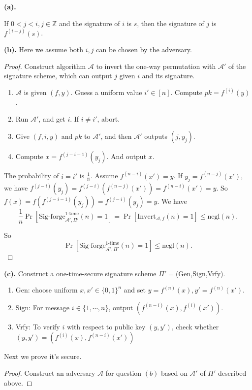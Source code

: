 \documentclass[a4paper]{article}
\newcommand{\negl}{\text{negl}}
\newcommand{\otime}{\text{1-time}}
\newcommand{\Invert}{\text{Invert}}
\newcommand{\Z}{\mathbb{Z}}
\newcommand{\A}{\mathcal{A}}
\newenvironment{problem}[2][Problem]{\begin{trivlist}
\item[\hskip \labelsep {\bfseries #1}\hskip \labelsep {\bfseries #2.}]}{\end{trivlist}}
\begin{document}
\begin{problem}{12.8}
\textbf{(a).}\par
If $0<j<i,j\in\Z$ and the signature of $i$ is $s$, then the signature of $j$ is $f^{(i-j)}(s)$.\par\vspace{1ex}
\textbf{(b).} Here we assume both $i,j$ can be chosen by the adversary.\par
\begin{proof}
Construct algorithm $\A$ to invert the one-way permutation with $\A'$ of the signature scheme, which can output $j$ given $i$ and its signature.\par
\begin{enumerate}
    \item $\A$ is given $(f,y)$. Guess a uniform value $i'\in[n]$. Compute $pk=f^{(i)}(y)$.
    \item Run $\A'$, and get $i$. If $i\ne i'$, abort.
    \item Give $(f,i,y)$ and $pk$ to $\A'$, and then $\A'$ outputs $(j,y_j)$.
    \item Compute $x=f^{(j-i-1)}(y_j)$. And output $x$.
\end{enumerate}\par
The probability of $i=i'$ is $\frac1n$. Assume $f^{(n-i)}(x')=y$. If $y_j=f^{(n-j)}(x')$, we have $f^{(j-i)}(y_j)=f^{(j-i)}(f^{(n-j)}(x'))=f^{(n-i)}(x')=y$. So $f(x)=f(f^{(j-i-1)}(y_j))=f^{(j-i)}(y_j)=y$. We have
$$\frac1n\Pr[\text{Sig-forge}_{\A',\Pi'}^{\otime}(n)=1]=\Pr[\Invert_{\A,f}(n)=1]\le\negl(n).$$\par
So $$\Pr[\text{Sig-forge}_{\A',\Pi'}^{\otime}(n)=1]\le \negl(n).$$
\end{proof}\vspace{1ex}
\textbf{(c).} 
Construct a one-time-secure signature scheme $\Pi'=$(Gen,Sign,Vrfy).
\begin{enumerate}
    \item Gen: choose uniform $x,x'\in\{0,1\}^n$ and set $y=f^{(n)}(x),y'=f^{(n)}(x')$.
    \item Sign: For message $i\in\{1,\cdots,n\}$, output $(f^{(n-i)}(x),f^{(i)}(x'))$.
    \item Vrfy: To verify $i$ with respect to public key $(y,y')$, check whether $(y,y')=(f^{(i)}(x),f^{(n-i)}(x'))$
\end{enumerate}\par
Next we prove it's secure.\par
\begin{proof}
Construct an adversary $\A$ for question $(b)$ based on $\A'$ of $\Pi'$ described above.\par 

\end{proof}
\end{problem}
\end{document}
